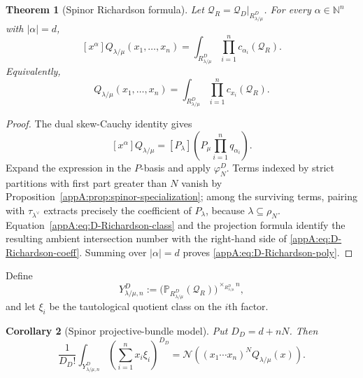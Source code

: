 \documentclass[11pt,a4paper,oneside]{amsart}
\numberwithin{equation}{section}
\newtheorem{theorem}{Theorem}[section]
\newtheorem{corollary}[theorem]{Corollary}
\theoremstyle{definition}
\theoremstyle{remark}
\newcommand{\cN}{\mathcal N}
\begin{document}
\begin{theorem}[Spinor Richardson formula]
\label{appA:thm:D-Richardson}
Let $\mathcal Q_R=\mathcal Q_D|_{R^D_{\lambda/\mu}}$.  For every
$\alpha\in\mathbb N^n$ with $|\alpha|=d$,
\begin{equation}
\label{appA:eq:D-Richardson-coeff}
  [x^\alpha]Q_{\lambda/\mu}(x_1,\ldots,x_n)
  =\int_{R^D_{\lambda/\mu}}
    \prod_{i=1}^n c_{\alpha_i}(\mathcal Q_R).
\end{equation}
Equivalently,
\begin{equation}
\label{appA:eq:D-Richardson-poly}
  Q_{\lambda/\mu}(x_1,\ldots,x_n)
  =\int_{R^D_{\lambda/\mu}}
    \prod_{i=1}^n c_{x_i}(\mathcal Q_R).
\end{equation}
\end{theorem}

\begin{proof}
The dual skew-Cauchy identity gives
\[
  [x^\alpha]Q_{\lambda/\mu}
  =[P_\lambda]\left(P_\mu\prod_{i=1}^nq_{\alpha_i}\right).
\]
Expand the expression in the $P$-basis and apply $\varphi_N^D$.
Terms indexed by strict partitions with first part greater than $N$ vanish by
Proposition~\ref{appA:prop:spinor-specialization}; among the surviving terms,
pairing with $\tau_{\lambda^\vee}$ extracts precisely the coefficient of
$P_\lambda$, because $\lambda\subseteq\rho_N$.  Equation~\eqref{appA:eq:D-Richardson-class} and the projection formula identify the
resulting ambient intersection number with the right-hand side of
\eqref{appA:eq:D-Richardson-coeff}.  Summing over $|\alpha|=d$ proves
\eqref{appA:eq:D-Richardson-poly}.
\end{proof}

Define
\begin{equation}
\label{appA:eq:D-projective-bundle}
  Y^D_{\lambda/\mu,n}
  :=\bigl(\mathbb P_{R^D_{\lambda/\mu}}(\mathcal Q_R)\bigr)
    ^{\times_{R^D_{\lambda/\mu}}n},
\end{equation}
and let $\xi_i$ be the tautological quotient class on the $i$th factor.

\begin{corollary}[Spinor projective-bundle model]
\label{appA:cor:D-projective-bundle}
Put $D_D=d+nN$.  Then
\begin{equation}
\label{appA:eq:D-volume-model}
  \frac{1}{D_D!}
  \int_{Y^D_{\lambda/\mu,n}}
  \left(\sum_{i=1}^n x_i\xi_i\right)^{D_D}
  =\cN\!\left((x_1\cdots x_n)^NQ_{\lambda/\mu}(x)\right).
\end{equation}
\end{corollary}
\end{document}
